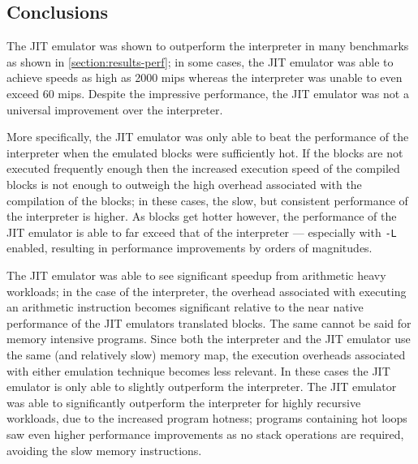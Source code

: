 \subsection{Conclusions}

The JIT emulator was shown to outperform the interpreter in many benchmarks as shown in \autoref{section:results-perf}; in some cases, the JIT emulator was able to achieve speeds as high as 2000 mips whereas the interpreter was unable to even exceed 60 mips. Despite the impressive performance, the JIT emulator was not a universal improvement over the interpreter.

More specifically, the JIT emulator was only able to beat the performance of the interpreter when the emulated blocks were sufficiently hot. If the blocks are not executed frequently enough then the increased execution speed of the compiled blocks is not enough to outweigh the high overhead associated with the compilation of the blocks; in these cases, the slow, but consistent performance of the interpreter is higher. As blocks get hotter however, the performance of the JIT emulator is able to far exceed that of the interpreter — especially with \texttt{-L} enabled, resulting in performance improvements by orders of magnitudes.

The JIT emulator was able to see significant speedup from arithmetic heavy workloads; in the case of the interpreter, the overhead associated with executing an arithmetic instruction becomes significant relative to the near native performance of the JIT emulators translated blocks. The same cannot be said for memory intensive programs. Since both the interpreter and the JIT emulator use the same (and relatively slow) memory map, the execution overheads associated with either emulation technique becomes less relevant. In these cases the JIT emulator is only able to slightly outperform the interpreter. The JIT emulator was able to significantly outperform the interpreter for highly recursive workloads, due to the increased program hotness; programs containing hot loops saw even higher performance improvements as no stack operations are required, avoiding the slow memory instructions.



